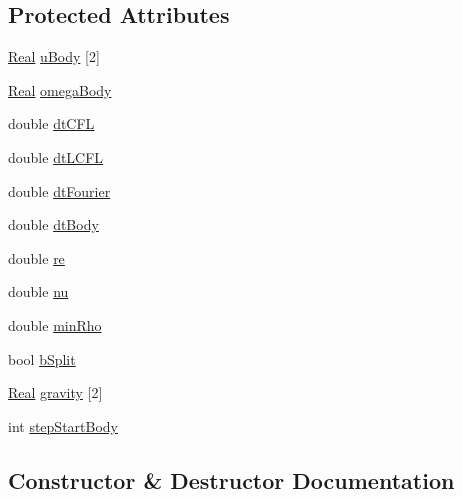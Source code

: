\subsection*{Protected Attributes}
\begin{DoxyCompactItemize}
\item 
\hyperlink{_h_d_f5_dumper_8h_a445a5f0e2a34c9d97d69a3c2d1957907}{Real} \hyperlink{class_sim___f_s_i___gravity_af025ee4e8818049798588010ed5ec20b}{u\+Body} \mbox{[}2\mbox{]}
\item 
\hyperlink{_h_d_f5_dumper_8h_a445a5f0e2a34c9d97d69a3c2d1957907}{Real} \hyperlink{class_sim___f_s_i___gravity_aaae0c523f41a6427f5ade85a53ab6e0e}{omega\+Body}
\item 
double \hyperlink{class_sim___f_s_i___gravity_acb747fc432b79e9f03348d74bcc929d0}{dt\+C\+F\+L}
\item 
double \hyperlink{class_sim___f_s_i___gravity_ae413dabd98cb3d62ef8a97e4049fc392}{dt\+L\+C\+F\+L}
\item 
double \hyperlink{class_sim___f_s_i___gravity_a4264fa344adca71913d1f4f085bd3c36}{dt\+Fourier}
\item 
double \hyperlink{class_sim___f_s_i___gravity_aa5eb5526dc487939dc0ef241e904481c}{dt\+Body}
\item 
double \hyperlink{class_sim___f_s_i___gravity_a98ecb780308dab7b8460f1b1366a0b95}{re}
\item 
double \hyperlink{class_sim___f_s_i___gravity_af18fe419afa26a1855d8cb2803eef039}{nu}
\item 
double \hyperlink{class_sim___f_s_i___gravity_a29e377488239d27f0a112ce9e4bf1e97}{min\+Rho}
\item 
bool \hyperlink{class_sim___f_s_i___gravity_ab2ec5a560dba9573d0c78325ae6b3661}{b\+Split}
\item 
\hyperlink{_h_d_f5_dumper_8h_a445a5f0e2a34c9d97d69a3c2d1957907}{Real} \hyperlink{class_sim___f_s_i___gravity_a4056a32c94c0375219f3248e29df7535}{gravity} \mbox{[}2\mbox{]}
\item 
int \hyperlink{class_sim___f_s_i___gravity_abeb07be239cdde2ac71a301ac867e8b3}{step\+Start\+Body}
\end{DoxyCompactItemize}


\subsection{Constructor \& Destructor Documentation}
\hypertarget{class_sim___f_s_i___gravity_a66f07ee31fb03d03da96cb53ec48af9d}{}
